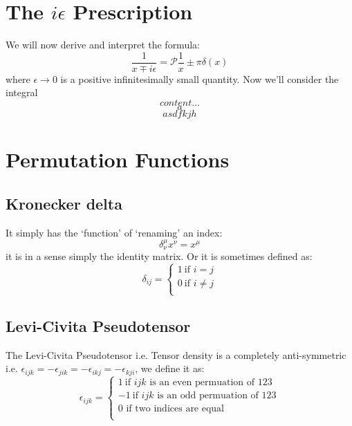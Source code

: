 \section{The $i \epsilon$ Prescription}
We will now derive and interpret the formula:
\begin{equation}
\frac{1}{x \mp i \epsilon} = \mathscr{P} \frac{1}{x} \pm \pi \delta (x)
\end{equation}
where $\epsilon \rightarrow 0$ is a positive infinitesimally small quantity. Now we'll consider the integral
\begin{equation}
	content...
\end{equation}
$$$$
\begin{equation}
a
\end{equation}
\begin{equation}
asdfkjh
\end{equation}
\section{Permutation Functions}
\subsection{Kronecker delta}
It simply has the ‘function’ of ‘renaming’ an index:
$$\delta^{\mu}_{\nu} x^{\nu} = x^{\mu}$$
it is in a sense simply the identity matrix. Or it is sometimes defined as:
\begin{equation}
\delta_{ij} = \begin{cases}
1 \ \text{if } i = j \\
0 \ \text{if } i \neq j\\
\end{cases}
\end{equation}
\subsection{Levi-Civita Pseudotensor}
\label{Levi}
The Levi-Civita Pseudotensor i.e. Tensor density is a completely anti-symmetric i.e. $\epsilon_{ijk} = -\epsilon_{jik} = -\epsilon_{ikj} = -\epsilon_{kji}$, we define it as:
\begin{equation}
\epsilon_{ijk} = \begin{cases}
1 \ \text{if } ijk \text{ is an even permuation of } 123\\
-1 \ \text{if } ijk \text{ is an odd permuation of } 123\\
0  \text{ if two indices are equal}\\
\end{cases}
\end{equation}
